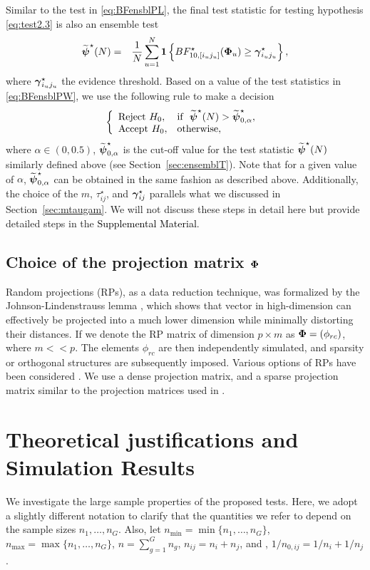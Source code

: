 \documentclass[times,sort&compress,3p]{elsarticle}
\theoremstyle{plain}%
\theoremstyle{definition}
\def\be{\begin{eqnarray}}
\def\ee{\end{eqnarray}}
\def\boldpsi{{\mbox{\boldmath $\psi$}}}
\def\bone{{\mathbf 1}}
\newcommand{\ugamma}            {\mbox{\boldmath$\gamma$}}
\newcommand{\uPhi}              {\mbox{\boldmath$\Phi$}}
\begin{document}
Similar to the test in \eqref{eq:BFensblPL}, the final test statistic for testing hypothesis \eqref{eq:test2.3} is also an ensemble test 
\be
\widetilde{\boldpsi}^{\star}(N) &=& \frac{1}{N}\sum^{N}_{u=1} \bone \left\{ BF^{\star}_{10, [i_u j_u]}(\uPhi_u) \geq \ugamma^{\star}_{i_u j_u} \right\}, \label{eq:BFensblPW}
\ee
where $\ugamma^{\star}_{i_u j_u}$ the evidence threshold. 
Based on a value of the test statistics in \eqref{eq:BFensblPW}, we use the following rule to make a decision
\be
 \left \{
       \begin{array}{llll}
       \mbox{Reject}~ H_{0}, & \mbox{if} ~~ \widetilde{\boldpsi}^{\star}(N) > \widetilde{\boldpsi}^{\star}_{0, \alpha},  \\
       \mbox{Accept}~ H_{0}, & \mbox{otherwise}, \label{eq:ensembleTestPw}
       \end{array}
       \right. \;
\ee
where $\alpha \in (0, 0.5)$, $\widetilde{\boldpsi}^{\star}_{0, \alpha}$ is the cut-off value for the test statistic $\widetilde{\boldpsi}^{\star}(N)$ similarly defined above (see Section~\ref{sec:ensemblT}). Note that for a given value of $\alpha$, $\widetilde{\boldpsi}^{\star}_{0, \alpha}$ can be obtained in the same fashion as described above. Additionally, the choice of the $m$, $\tau^{\star}_{ij}$, and $\ugamma^{\star}_{ij}$ parallels what we discussed in Section~\ref{sec:mtaugam}. We will not discuss these steps in detail here but provide detailed steps in the \textcolor{black}{Supplemental Material}.    

\subsection{Choice of the projection matrix $\uPhi$}
Random projections (RPs), as a data reduction technique, was formalized by the Johnson-Lindenstrauss lemma \cite{johnson84extensionslipschitz}, which shows that vector in high-dimension can effectively be projected into a much lower dimension while minimally distorting their distances. If we denote the RP matrix of dimension $p \times m$ as $\uPhi = (\phi_{rc})$, where $m << p$. The elements $\phi_{rc}$ are then independently simulated, and sparsity or orthogonal structures are subsequently imposed. Various options of RPs have been considered \cite{achlioptas2001database,li2006very,lopes2011more}. We use a dense projection matrix, and a sparse projection matrix similar to the projection matrices used in \cite{srivastava2014raptt,zoh2018powerful}.      

\section{Theoretical justifications and Simulation Results} \label{sec:theori}
We investigate the large sample properties of the proposed tests. 
Here, we adopt a slightly different notation to clarify that the quantities we refer to depend on the sample sizes $n_1, \ldots, n_{G}$. Also, let $n_{\min} = \min\{n_1,\ldots, n_{G}\}$, $n_{\max} = \max\{n_1,\ldots, n_{G}\}$, $n = \sum^{G}_{g=1}n_g$, $n_{ij} = n_i + n_j$, and , $1/n_{0,ij} = 1/n_i + 1/n_j$. %
\end{document}
